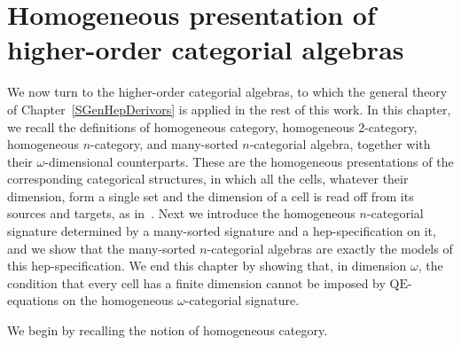 \documentclass[a4paper, reqno]{amsbook}
\newcommand{\QE}{\mathrm{QE}}
\theoremstyle{plain}
\theoremstyle{definition}
\begin{document}
\chapter[Homogeneous presentation]{Homogeneous presentation of higher-order categorial algebras}\label{SHomogeneous}

We now turn to the higher-order categorial algebras, to which the general theory of Chapter~\ref{SGenHepDerivors} is applied in the rest of this work.
In this chapter, we recall the definitions of homogeneous category, homogeneous $2$-category, homogeneous $n$-category, and many-sorted $n$-categorial algebra, together with their $\omega$-dimensional counterparts.
These are the homogeneous presentations of the corresponding categorical structures, in which all the cells, whatever their dimension, form a single set and the dimension of a cell is read off from its sources and targets, as in~\cite{Street1987}.
Next we introduce the homogeneous $n$-categorial signature determined by a many-sorted signature and a hep-specification on it, and we show that the many-sorted $n$-categorial algebras are exactly the models of this hep-specification.
We end this chapter by showing that, in dimension $\omega$, the condition that every cell has a finite dimension cannot be imposed by $\QE$-equations on the homogeneous $\omega$-categorial signature.

We begin by recalling the notion of homogeneous category.
\end{document}
